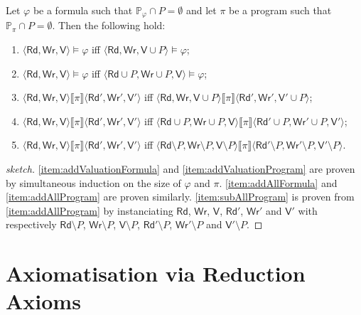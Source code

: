\documentclass{llncs}
\newcommand{\readset}{\mathsf{Rd}}
\newcommand{\valuset}{\mathsf{V}}
\newcommand{\writeset}{\mathsf{Wr}}
\newcommand{\intPgm}[1]{\llbracket #1 \rrbracket}
\renewcommand{\phi}{\varphi}
\newcommand{\propset}{\mathbb P}
\newcommand{\propsetOf}[1]{\propset_{#1}}
\newcommand{\tuple}[1]{ \langle #1 \rangle}
\begin{document}
\begin{lemma}\label{theo:irrelevantVariables}
Let $\phi$ be a formula such that $\propsetOf \phi \cap P = \emptyset$ and
let $ \pi$ be a program such that $\propsetOf \pi \cap P = \emptyset$. Then the following hold:
\begin{enumerate}
\item\label{item:addValuationFormula}
$\tuple{\readset,\writeset,\valuset} \models \phi $ iff
$\tuple{\readset,\writeset,\valuset\cup P} \models \phi$;
\item\label{item:addAllFormula}
$\tuple{\readset,\writeset,\valuset} \models \phi $ iff
$\tuple{\readset\cup P,\writeset\cup P,\valuset} \models \phi$;
\item\label{item:addValuationProgram}
$\tuple{\readset,\writeset,\valuset} \intPgm \pi \tuple{\readset',\writeset',\valuset'} $ iff
$\tuple{\readset,\writeset,\valuset\cup P} \intPgm \pi \tuple{\readset',\writeset',\valuset'\cup P} $;
\item\label{item:addAllProgram}
$\tuple{\readset,\writeset,\valuset} \intPgm \pi \tuple{\readset',\writeset',\valuset'} $ iff
$\tuple{\readset\cup P,\writeset\cup P,\valuset} \intPgm \pi \tuple{\readset'\cup P,\writeset'\cup P,\valuset'} $;
\item\label{item:subAllProgram}
$\tuple{\readset,\writeset,\valuset} \intPgm \pi \tuple{\readset',\writeset',\valuset'} $ iff
$\tuple{\readset\setminus P,\writeset\setminus P,\valuset\setminus P} \intPgm \pi \tuple{\readset'\setminus P,\writeset'\setminus P,\valuset'\setminus P} $.
\end{enumerate}
\end{lemma}
\begin{proof}[sketch]
\ref{item:addValuationFormula} and \ref{item:addValuationProgram} are proven by simultaneous
induction on the size of $\phi$ and $\pi$.
\ref{item:addAllFormula} and \ref{item:addAllProgram} are proven similarly.
\ref{item:subAllProgram} is proven from \ref{item:addAllProgram} by instanciating $\readset$,
$\writeset$, $\valuset$, $\readset'$, $\writeset'$ and $\valuset'$ with respectively
$\readset\setminus P$, $\writeset\setminus P$, $\valuset\setminus P$, $\readset'\setminus P$,
$\writeset'\setminus P$ and $\valuset'\setminus P$.
\end{proof}



\section{Axiomatisation via Reduction Axioms}\label{sec:axiomatisation}
\end{document}
